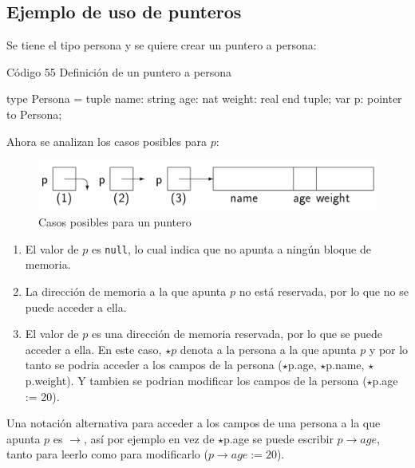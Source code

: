 \subsection{Ejemplo de uso de punteros}
Se tiene el tipo persona y se quiere crear un puntero a persona:
\begin{codebox}{Código 55}
\footnotesize Definición de un puntero a persona
\tcblower
\begin{pascallike}
type Persona = tuple
                name: string
                age: nat
                weight: real
            end tuple;
var p: pointer to Persona;
\end{pascallike}
\end{codebox}
Ahora se analizan los casos posibles para $p$:
\begin{figure}[h]
    \centering
    \includegraphics[scale=0.5]{./estáticos/punterosej.png}
    \caption{Casos posibles para un puntero}
    \label{fig:my_label}
\end{figure}
\begin{enumerate}
    \item El valor de $p$ es \texttt{null}, lo cual indica que no apunta a ningún bloque de memoria.
    \item La dirección de memoria a la que apunta $p$ no está reservada, por lo que no se puede acceder a ella.
    \item El valor de $p$ es una dirección de memoria reservada, por lo que se puede acceder a ella. En este caso, $\star p$ denota a la persona a la que apunta $p$ y por lo tanto se podria acceder a los campos de la persona ($\star$p.age, $\star$p.name, $\star$p.weight). Y tambien se podrian modificar los campos de la persona ($\star$p.age := 20).
\end{enumerate}
Una notación alternativa para acceder a los campos de una persona a la que apunta $p$ es $\rightarrow$, así por ejemplo en vez de $\star$p.age se puede escribir $p\rightarrow age$, tanto para leerlo como para modificarlo ($p\rightarrow age := 20$).

